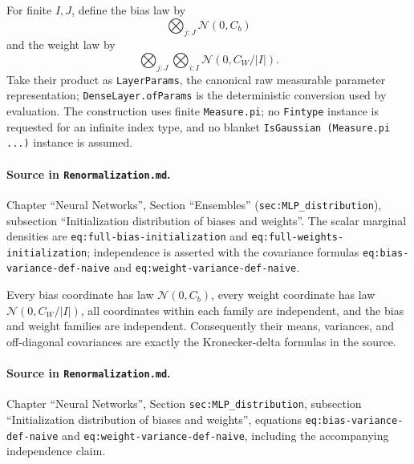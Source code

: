 \begin{definition}
\label{def:renorm:layerGaussianInit}
For finite $I,J$, define the bias law by
\[
  \bigotimes_{j:J}\mathcal N(0,C_b)
\]
and the weight law by
\[
  \bigotimes_{j:J}\bigotimes_{i:I}\mathcal N(0,C_W/|I|).
\]
Take their product as \texttt{LayerParams}, the canonical raw measurable parameter representation;
\texttt{DenseLayer.ofParams} is the deterministic conversion used by evaluation.  The construction
uses finite \texttt{Measure.pi}; no \texttt{Fintype} instance is requested for an infinite index
type, and no blanket \texttt{IsGaussian (Measure.pi ...)} instance is assumed.

\paragraph{Source in \texttt{Renormalization.md}.}
Chapter ``Neural Networks'', Section ``Ensembles'' (\texttt{sec:MLP\_distribution}), subsection
``Initialization distribution of biases and weights''.  The scalar marginal densities are
\texttt{eq:full-bias-initialization} and \texttt{eq:full-weights-initialization}; independence is
asserted with the covariance formulas \texttt{eq:bias-variance-def-naive} and
\texttt{eq:weight-variance-def-naive}.
\end{definition}

\begin{lemma}
\label{lem:renorm:initCoordinates}
Every bias coordinate has law $\mathcal N(0,C_b)$, every weight coordinate has law
$\mathcal N(0,C_W/|I|)$, all coordinates within each family are independent, and the bias and weight
families are independent.  Consequently their means, variances, and off-diagonal covariances are
exactly the Kronecker-delta formulas in the source.

\paragraph{Source in \texttt{Renormalization.md}.}
Chapter ``Neural Networks'', Section \texttt{sec:MLP\_distribution}, subsection ``Initialization
distribution of biases and weights'', equations \texttt{eq:bias-variance-def-naive} and
\texttt{eq:weight-variance-def-naive}, including the accompanying independence claim.
\end{lemma}

